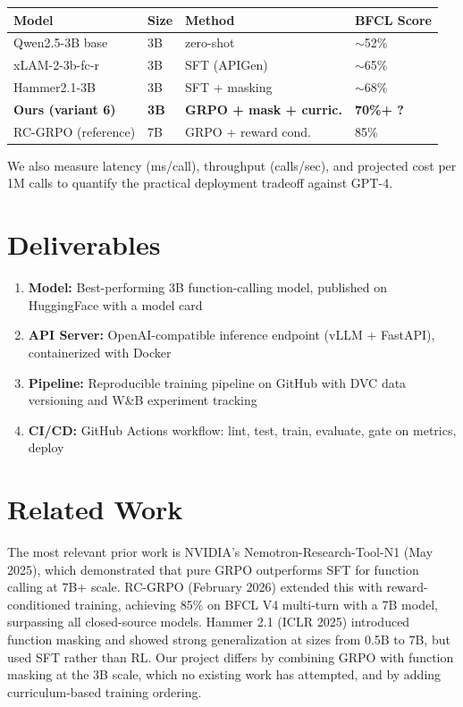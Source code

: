 \documentclass[11pt, letterpaper]{article}
\begin{document}
\begin{table}[h]
\centering
\small
\begin{tabular}{@{}llll@{}}
\toprule
\textbf{Model} & \textbf{Size} & \textbf{Method} & \textbf{BFCL Score} \\
\midrule
Qwen2.5-3B base & 3B & zero-shot & $\sim$52\% \\
xLAM-2-3b-fc-r & 3B & SFT (APIGen) & $\sim$65\% \\
Hammer2.1-3B & 3B & SFT + masking & $\sim$68\% \\
\textbf{Ours (variant 6)} & \textbf{3B} & \textbf{GRPO + mask + curric.} & \textbf{70\%+ ?} \\
\midrule
\color{dimgray}RC-GRPO (reference) & \color{dimgray}7B & \color{dimgray}GRPO + reward cond. & \color{dimgray}85\% \\
\bottomrule
\end{tabular}
\end{table}

We also measure latency (ms/call), throughput (calls/sec), and projected cost per 1M calls to quantify the practical deployment tradeoff against GPT-4.

\section*{Deliverables}

\begin{enumerate}
  \item \textbf{Model:} Best-performing 3B function-calling model, published on HuggingFace with a model card
  \item \textbf{API Server:} OpenAI-compatible inference endpoint (vLLM + FastAPI), containerized with Docker
  \item \textbf{Pipeline:} Reproducible training pipeline on GitHub with DVC data versioning and W\&B experiment tracking
  \item \textbf{CI/CD:} GitHub Actions workflow: lint, test, train, evaluate, gate on metrics, deploy
\end{enumerate}

\section*{Related Work}

The most relevant prior work is NVIDIA's Nemotron-Research-Tool-N1 (May 2025), which demonstrated that pure GRPO outperforms SFT for function calling at 7B+ scale. RC-GRPO (February 2026) extended this with reward-conditioned training, achieving 85\% on BFCL V4 multi-turn with a 7B model, surpassing all closed-source models. Hammer 2.1 (ICLR 2025) introduced function masking and showed strong generalization at sizes from 0.5B to 7B, but used SFT rather than RL. Our project differs by combining GRPO with function masking at the 3B scale, which no existing work has attempted, and by adding curriculum-based training ordering.
\end{document}
